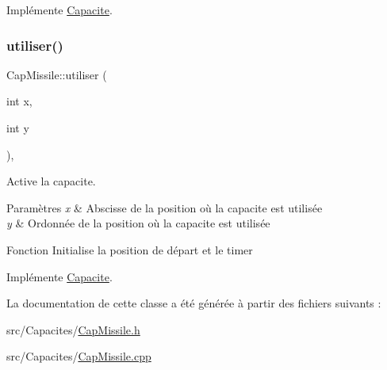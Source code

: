 Implémente \hyperlink{class_capacite_a75c9621d7a704fedb10ad29c6a697d64}{Capacite}.

\mbox{\label{class_cap_missile_a4ba082615a3721083142549a4c8216ad}} 
\subsubsection{\texorpdfstring{utiliser()}{utiliser()}}
{\footnotesize\ttfamily Cap\+Missile\+::utiliser (\begin{DoxyParamCaption}\item[{int}]{x,  }\item[{int}]{y }\end{DoxyParamCaption})\hspace{0.3cm}{\ttfamily [override]}, {\ttfamily [virtual]}}



Active la capacite. 


\begin{DoxyParams}{Paramètres}
{\em x} & Abscisse de la position où la capacite est utilisée \\
\hline
{\em y} & Ordonnée de la position où la capacite est utilisée\\
\hline
\end{DoxyParams}
Fonction Initialise la position de départ et le timer 

Implémente \hyperlink{class_capacite_a6f5e6efda11f80ab8538e23f5bdc6e79}{Capacite}.



La documentation de cette classe a été générée à partir des fichiers suivants \+:\begin{DoxyCompactItemize}
\item 
src/\+Capacites/\hyperlink{_cap_missile_8h}{Cap\+Missile.\+h}\item 
src/\+Capacites/\hyperlink{_cap_missile_8cpp}{Cap\+Missile.\+cpp}\end{DoxyCompactItemize}
